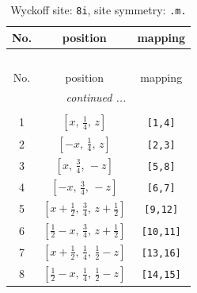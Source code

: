 \documentclass[fleqn,8pt]{jsarticle}
\begin{document}
\begin{longtable}{ccc}
\caption{Wyckoff site: {\tt 8i}, site symmetry: {\tt .m.}}
 \\
 \hline \hline
No. & position & mapping \\ \hline \endfirsthead

\multicolumn{2}{l}{\tablename\ \thetable{}} \\
 \hline \hline
No. & position & mapping \\ \hline \endhead

 \hline \hline
\multicolumn{2}{r}{\footnotesize\it continued ...} \\ \endfoot

 \hline \hline
\multicolumn{2}{r}{} \\ \endlastfoot

1 & $\left[ x,\, \frac{1}{4},\, z \right]$ & {\tt [1,4]} \\ \hline
2 & $\left[ - x,\, \frac{1}{4},\, z \right]$ & {\tt [2,3]} \\ \hline
3 & $\left[ x,\, \frac{3}{4},\, - z \right]$ & {\tt [5,8]} \\ \hline
4 & $\left[ - x,\, \frac{3}{4},\, - z \right]$ & {\tt [6,7]} \\ \hline
5 & $\left[ x + \frac{1}{2},\, \frac{3}{4},\, z + \frac{1}{2} \right]$ & {\tt [9,12]} \\ \hline
6 & $\left[ \frac{1}{2} - x,\, \frac{3}{4},\, z + \frac{1}{2} \right]$ & {\tt [10,11]} \\ \hline
7 & $\left[ x + \frac{1}{2},\, \frac{1}{4},\, \frac{1}{2} - z \right]$ & {\tt [13,16]} \\ \hline
8 & $\left[ \frac{1}{2} - x,\, \frac{1}{4},\, \frac{1}{2} - z \right]$ & {\tt [14,15]} \\
\end{longtable}
\renewcommand{\arraystretch}{1.2}
\end{document}
